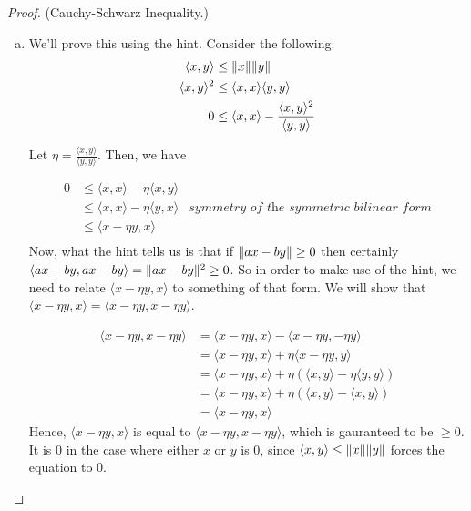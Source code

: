 \documentclass[10pt, oneside]{article}   	%
\newcommand{\innerprod}[2]{\langle #1, #2 \rangle}
\DeclarePairedDelimiter{\norm}{\lVert}{\rVert}
\begin{document}
\begin{proof} (Cauchy-Schwarz Inequality.)

\par

\begin{enumerate}[a)]
	\item We'll prove this using the hint. Consider the following:
	\begin{equation} 
		\begin{aligned}
			\innerprod{x}{y} &\leq \norm{x}\norm{y} \\
			\innerprod{x}{y}^2 &\leq \innerprod{x}{x}\innerprod{y}{y} \\
			0 &\leq  \innerprod{x}{x} - \frac{\innerprod{x}{y}^2}{\innerprod{y}{y}}
		\end{aligned}
	\end{equation}
	
	Let $\eta = \frac{\innerprod{x}{y}}{\innerprod{y}{y}}$. Then, we have 
	
	\begin{equation}
		\begin{aligned}
			0 &\leq \innerprod{x}{x} - \eta\innerprod{x}{y} \\
			 & \leq \innerprod{x}{x} - \eta\innerprod{y}{x} & \textit{symmetry of the symmetric bilinear form} \\
			 & \leq \innerprod{x - \eta y}{x} \\
		\end{aligned}
	\end{equation}
	Now, what the hint tells us is that if $\norm{ax - by} \geq 0$ then certainly $\innerprod{ax - by}{ax - by} = \norm{ax - by}^2 \geq 0$. So in order to make use of the hint, we need to relate $\innerprod{x - \eta y}{x} $ to something of that form.  We will show that $\innerprod{x - \eta y}{x} = \innerprod{x - \eta y}{x - \eta y}$. 
	
	\begin{equation}
		\begin{aligned}
			 \innerprod{x - \eta y}{x - \eta y}  &=  \innerprod{x - \eta y}{x} - \innerprod{x - \eta y}{- \eta y} \\
			  &= \innerprod{x - \eta y}{x} + \eta \innerprod{x - \eta y}{y} \\
			  &= \innerprod{x - \eta y}{x} + \eta (\innerprod{x}{y} - \eta \innerprod{y}{y}) \\
			  &= \innerprod{x - \eta y}{x} + \eta (\innerprod{x}{y} - \innerprod{x}{y}) \\
			  &=  \innerprod{x - \eta y}{x}
	 	\end{aligned}
	\end{equation}
	Hence, $\innerprod{x - \eta y}{x}$ is equal to $\innerprod{x - \eta y}{x - \eta y}$, which is gauranteed to be $\geq 0$. It is 0 in the case where either $x$ or $y$ is 0, since $\innerprod{x}{y} \leq \norm{x}\norm{y}$ forces the equation to 0. 


\end{enumerate}
\end{proof}
\end{document}
